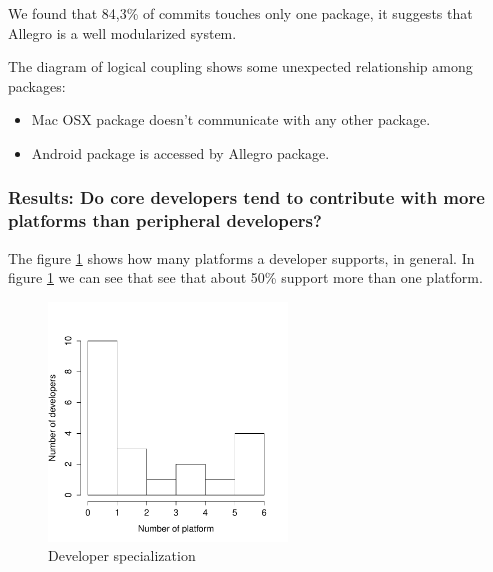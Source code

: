 \documentclass[10pt, conference]{IEEEtran}
\begin{document}
We found that 84,3\% of commits touches only one package, it suggests that Allegro is a well modularized system. 

The diagram of logical coupling shows some unexpected relationship among packages:

\begin{itemize}
\item Mac OSX package doesn't communicate with any other package.
\item  Android package is accessed by Allegro package.
\end{itemize}


\subsubsection{Results: Do core developers tend to contribute with more platforms than peripheral developers?}

The figure \ref{DeveloperSpecialization} shows how many platforms a developer supports, in general. In figure \ref{DeveloperSpecialization} we can see that see that about 50\% support more than one platform. 


\begin{figure}[h]
\centering
\includegraphics[width=2.5in]{DeveloperSpecialization}
\caption{Developer specialization}
\label{DeveloperSpecialization}
\end{figure}
\end{document}
